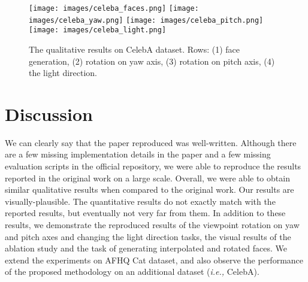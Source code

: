 \begin{figure}[t!]
    \centering
    \texttt{[image: images/celeba\_faces.png]}
    \texttt{[image: images/celeba\_yaw.png]}
    \texttt{[image: images/celeba\_pitch.png]}
    \texttt{[image: images/celeba\_light.png]}
    \caption{The qualitative results on CelebA dataset. Rows: (1) face generation, (2) rotation on yaw axis, (3) rotation on pitch axis, (4) the light direction.}
    \label{fig:celeba_results}
\end{figure}


\section{Discussion}

We can clearly say that the paper reproduced was well-written. Although there are a few missing implementation details in the paper and a few missing evaluation scripts in the official repository, we were able to reproduce the results reported in the original work on a large scale. 
Overall, we were able to obtain similar qualitative results when compared to the original work. Our results are visually-plausible. The quantitative results do not exactly match with the reported results, but eventually not very far from them. In addition to these results, we demonstrate the reproduced results of the viewpoint rotation on yaw and pitch axes and changing the light direction tasks, the visual results of the ablation study and the task of generating interpolated and rotated faces. We extend the experiments on AFHQ Cat dataset, and also observe the performance of the proposed methodology on an additional dataset (\textit{i.e.,} CelebA).

